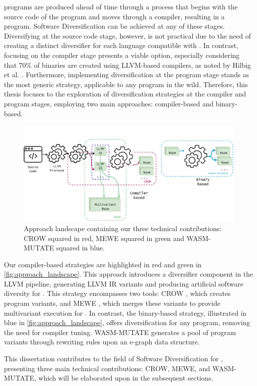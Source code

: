 


\Wasm programs are produced ahead of time through a process that begins with the source code of the program and moves through a compiler, resulting in a \Wasm program. 
Software Diversification can be achieved at any of these stages. 
Diversifying at the source code stage, however, is not practical due to the need of creating a distinct diversifier for each language compatible with \Wasm. 
In contrast, focusing on the compiler stage presents a viable option, especially considering that 70\% of \Wasm binaries are created using LLVM-based compilers, as noted by Hilbig et al. \cite{Hilbig2021AnES}. 
Furthermore, implementing diversification at the \Wasm program stage stands as the most generic strategy, applicable to any \Wasm program in the wild. 
Therefore, this thesis focuses to the exploration of diversification strategies at the compiler and \Wasm program stages, employing two main approaches: compiler-based and binary-based.


\begin{figure}[h]
	\centering
	\includegraphics[width=1.0\textwidth]{figures/landscape.pdf}
	\caption{Approach landscape containing our three technical contributions: CROW squared in red, MEWE squared in green and WASM-MUTATE squared in blue.}
	\label{fig:approach_landscape}
\end{figure}

Our compiler-based strategies are highlighted in red and green in \autoref{fig:approach_landscape}. 
This approach introduces a diversifier component in the LLVM pipeline, generating LLVM IR variants and producing artificial software diversity for \wasm. 
This strategy encompasses two tools: CROW \cite{CROW}, which creates \wasm program variants, and MEWE \cite{MEWE}, which merges these variants to provide multivariant execution for \wasm.
In contrast, the binary-based strategy, illustrated in blue in \autoref{fig:approach_landscape}, offers diversification for any \Wasm program, removing the need for compiler tuning. 
WASM-MUTATE \cite{wasmmutate} generates a pool of \Wasm program variants through rewriting rules upon an e-graph \cite{e-graph} data structure.


This dissertation contributes to the field of Software Diversification for \Wasm, presenting three main technical contributions: CROW, MEWE, and WASM-MUTATE, which will be elaborated upon in the subsequent sections.

